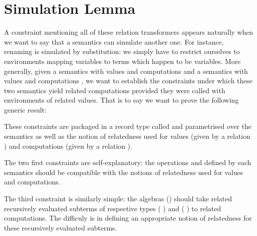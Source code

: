 \section{Simulation Lemma}\label{section:simulation}

A constraint mentioning all of these relation transformers appears naturally when
we want to say that a semantics can simulate another one. For instance, renaming
is simulated by substitution: we simply have to restrict ourselves to environments
mapping variables to terms which happen to be variables.
More generally, given a semantics  with values  and computations
 and a semantics  with values  and computations ,
we want to establish the constraints under which these two semantics yield
related computations provided they were called with environments of related values.
That is to say we want to prove the following generic result:

\begin{agdasnippet}
\end{agdasnippet}

These constraints are packaged in a record type called  and
parametrised over the semantics as well as the notion of relatedness used
for values (given by a relation ) and computations
(given by a relation ).

\begin{agdasnippet}
\end{agdasnippet}

The two first constraints are self-explanatory: the operations
 and  defined by each semantics
should be compatible with the notions of relatedness used for values and computations.

\begin{agdasnippet}
\addtolength{\leftskip}{\parindent}
\begin{AgdaSuppressSpace}
\end{AgdaSuppressSpace}
\end{agdasnippet}

The third constraint is similarly simple: the algebras () should take
related recursively evaluated subterms of respective types
   (  ) and
   (  ) to related computations.
The difficuly is in defining an appropriate notion of relatedness 
for these recursively evaluated subterms.

